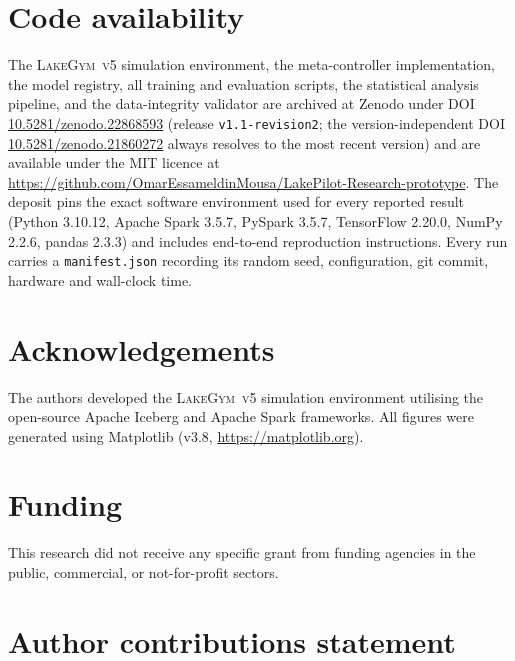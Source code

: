 \documentclass[fleqn,10pt]{wlscirep}
\newcommand{\env}{\textsc{LakeGym~v5}}
\begin{document}
\section*{Code availability}
The \env{} simulation environment, the meta-controller implementation,
the model registry, all training and evaluation scripts, the statistical
analysis pipeline, and the data-integrity validator are archived at
Zenodo under DOI
\href{https://doi.org/10.5281/zenodo.22868593}{10.5281/zenodo.22868593}
(release \texttt{v1.1-revision2}; the version-independent DOI
\href{https://doi.org/10.5281/zenodo.21860272}{10.5281/zenodo.21860272}
always resolves to the most recent version) and are available under the
MIT licence at
\url{https://github.com/OmarEssameldinMousa/LakePilot-Research-prototype}.
The deposit pins the exact software environment used for every reported
result (Python 3.10.12, Apache Spark 3.5.7, PySpark 3.5.7,
TensorFlow 2.20.0, NumPy 2.2.6, pandas 2.3.3) and includes end-to-end
reproduction instructions. Every run carries a \texttt{manifest.json}
recording its random seed, configuration, git commit, hardware and
wall-clock time.

\section*{Acknowledgements}

The authors developed the \env{} simulation environment utilising the
open-source Apache Iceberg and Apache Spark frameworks.
All figures were generated using Matplotlib
(v3.8, \url{https://matplotlib.org}).

\section*{Funding}
This research did not receive any specific grant from funding agencies
in the public, commercial, or not-for-profit sectors.

\section*{Author contributions statement}
\end{document}
